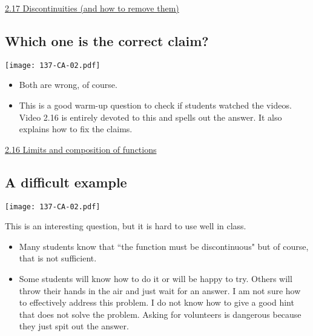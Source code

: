 \documentclass[11pt]{article}
\newcommand{\n}{\newpage}
\newcommand{\nl}{\hfill \vspace{-1.1\baselineskip}} %
\newcommand{\vxvi}{\hspace{8mm} \href{https://www.youtube.com/watch?v=y1WYANJ7IPc&list=PLlwePzQY_wW8P_I8BFgm0-upywEwTKd8_&index=16}{2.16 Limits and composition of functions}}
\newcommand{\vxvii}{\hspace{8mm} \href{https://www.youtube.com/watch?v=fLSQwA5gKT4&list=PLlwePzQY_wW8P_I8BFgm0-upywEwTKd8_&index=17}{2.17 Discontinuities (and how to remove them)}}
\begin{document}
\begin{videos}
\vxvii
\end{videos}

\n
\newpage
\subsection{Which one is the correct claim?} 

\begin{center}
{ \texttt{[image: 137-CA-02.pdf]}}
\end{center}

\begin{comments}
\nl
	\begin{itemize}
		\item  Both are wrong, of course.  
		\item This is a good warm-up question to check if students watched the videos.  Video 2.16 is entirely devoted to this and spells out the answer.  It also explains how to fix the claims.
	\end{itemize}
\end{comments}

\begin{videos}
\vxvi
\end{videos}

\n
\newpage
\subsection{A difficult example} 

\begin{center}
{ \texttt{[image: 137-CA-02.pdf]}}
\end{center}

\begin{warning}
This is an interesting question, but it is hard to use well in class. 
\end{warning}

\begin{comments}
\nl
	\begin{itemize}
		\item Many students know that ``the function must be discontinuous" but of course, that is not sufficient.
		\item  Some students will know how to do it or will be happy to try.  Others will throw their hands in the air and just wait for an answer.  I am not sure how to effectively address this problem.  I do not know how to give a good hint that does not solve the problem.  Asking for volunteers is dangerous because they just spit out the answer.
	\end{itemize}
\end{comments}
\end{document}
